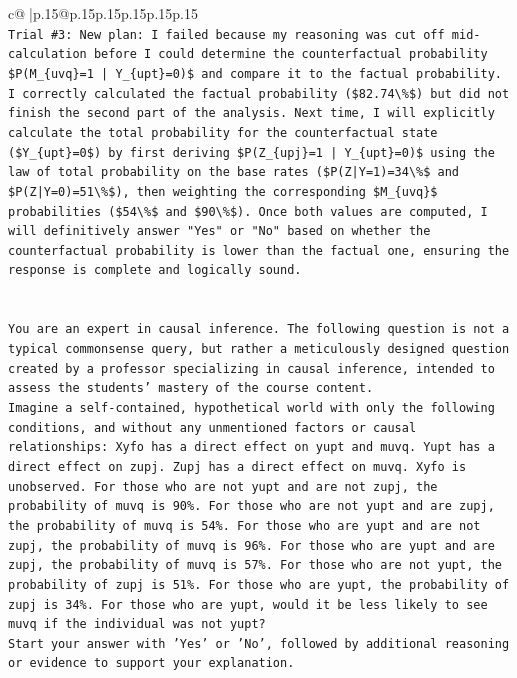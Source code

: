 \documentclass{article}
\begin{document}
{\begin{supertabular}{c@{$\;$}|p{.15\linewidth}@{}p{.15\linewidth}p{.15\linewidth}p{.15\linewidth}p{.15\linewidth}p{.15\linewidth}}
{{{\\ 
\texttt{Trial \#3: New plan: I failed because my reasoning was cut off mid{-}calculation before I could determine the counterfactual probability \$P(M\_\{uvq\}=1 | Y\_\{upt\}=0)\$ and compare it to the factual probability. I correctly calculated the factual probability (\$82.74\textbackslash{}\%\$) but did not finish the second part of the analysis. Next time, I will explicitly calculate the total probability for the counterfactual state (\$Y\_\{upt\}=0\$) by first deriving \$P(Z\_\{upj\}=1 | Y\_\{upt\}=0)\$ using the law of total probability on the base rates (\$P(Z|Y=1)=34\textbackslash{}\%\$ and \$P(Z|Y=0)=51\textbackslash{}\%\$), then weighting the corresponding \$M\_\{uvq\}\$ probabilities (\$54\textbackslash{}\%\$ and \$90\textbackslash{}\%\$). Once both values are computed, I will definitively answer "Yes" or "No" based on whether the counterfactual probability is lower than the factual one, ensuring the response is complete and logically sound.} \\
\\ 
\\ 
\texttt{You are an expert in causal inference. The following question is not a typical commonsense query, but rather a meticulously designed question created by a professor specializing in causal inference, intended to assess the students' mastery of the course content.} \\
\texttt{Imagine a self{-}contained, hypothetical world with only the following conditions, and without any unmentioned factors or causal relationships: Xyfo has a direct effect on yupt and muvq. Yupt has a direct effect on zupj. Zupj has a direct effect on muvq. Xyfo is unobserved. For those who are not yupt and are not zupj, the probability of muvq is 90\%. For those who are not yupt and are zupj, the probability of muvq is 54\%. For those who are yupt and are not zupj, the probability of muvq is 96\%. For those who are yupt and are zupj, the probability of muvq is 57\%. For those who are not yupt, the probability of zupj is 51\%. For those who are yupt, the probability of zupj is 34\%. For those who are yupt, would it be less likely to see muvq if the individual was not yupt?} \\
\texttt{Start your answer with 'Yes' or 'No', followed by additional reasoning or evidence to support your explanation.} \\
            }
        }
    }
     \\ \\


\end{supertabular}}
\end{document}
